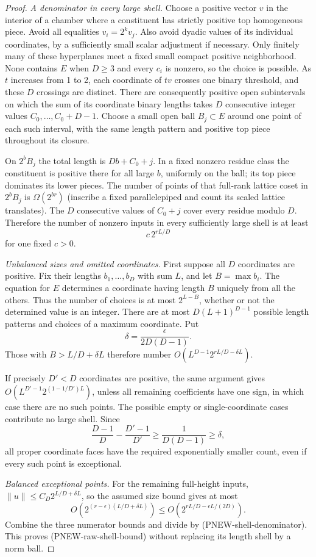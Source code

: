 \begin{proof}
\emph{A denominator in every large shell.}
Choose a positive vector $v$ in the interior of a chamber
where a constituent has strictly positive top homogeneous
piece.  Avoid all equalities $v_i=2^k v_j$.
Also avoid dyadic values of its individual coordinates, by
a sufficiently small scalar adjustment if necessary.
Only finitely many of these hyperplanes meet a fixed small
compact positive neighborhood.  None contains $E$ when
$D\ge3$ and every $c_i$ is nonzero, so the choice is possible.
As $t$ increases from 1 to 2, each coordinate of $tv$ crosses
one binary threshold, and these $D$ crossings are distinct.
There are consequently positive open subintervals on which
the sum of its coordinate binary lengths takes $D$
consecutive integer values $C_0,\ldots,C_0+D-1$.
Choose a small open ball $B_j\subset E$ around one point
of each such interval, with the same length pattern and
positive top piece throughout its closure.

On $2^bB_j$ the total length is $Db+C_0+j$.
In a fixed nonzero residue class the constituent is positive
there for all large $b$, uniformly on the ball; its top
piece dominates its lower pieces.  The number of points of
that full-rank lattice coset in $2^bB_j$ is
$\Omega(2^{br})$ (inscribe a fixed parallelepiped and count
its scaled lattice translates).  The $D$ consecutive values
of $C_0+j$ cover every residue modulo $D$.  Therefore the
number of nonzero inputs in every sufficiently large shell
is at least
\[
                         c\,2^{rL/D}
 \tag{PNEW-shell-denominator}
\]
for one fixed $c>0$.

\emph{Unbalanced sizes and omitted coordinates.}
First suppose all $D$ coordinates are positive.  Fix their
lengths $b_1,\ldots,b_D$ with sum $L$, and let
$B=\max b_i$.  The equation for $E$ determines a coordinate
having length $B$ uniquely from all the others.  Thus the
number of choices is at most $2^{L-B}$, whether or not the
determined value is an integer.  There are at most
$D(L+1)^{D-1}$ possible length patterns and choices of a
maximum coordinate.  Put
\[
                      \delta=\frac{\epsilon}{2D(D-1)}.
\]
Those with $B>L/D+\delta L$ therefore number
$O(L^{D-1}2^{rL/D-\delta L})$.

If precisely $D'<D$ coordinates are positive, the same
argument gives $O(L^{D'-1}2^{(1-1/D')L})$, unless all
remaining coefficients have one sign, in which case there
are no such points.  The possible empty or single-coordinate
cases contribute no large shell.  Since
\[
 \frac{D-1}{D}-\frac{D'-1}{D'}\ge\frac1{D(D-1)}\ge\delta,
\]
all proper coordinate faces have the required exponentially
smaller count, even if every such point is exceptional.

\emph{Balanced exceptional points.}
For the remaining full-height inputs,
$\|u\|\le C_D2^{L/D+\delta L}$, so the assumed size bound
gives at most
\[
 O\!\left(2^{(r-\epsilon)(L/D+\delta L)}\right)
       \le O\!\left(2^{rL/D-\epsilon L/(2D)}\right).
\]
Combine the three numerator bounds and divide by
(PNEW-shell-denominator).  This proves
(PNEW-raw-shell-bound) without replacing its length shell
by a norm ball.
\end{proof}

